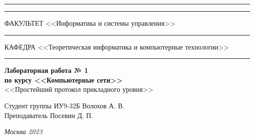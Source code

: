 \documentclass[a4paper, 14pt]{extarticle}
\begin{document}
\begin{titlepage}
\vspace{-25pt}
\hspace{-35pt}\rule{\textwidth}{2.3pt}

\vspace*{-20.3pt}
\hspace{-35pt}\rule{\textwidth}{0.4pt}

\vspace{1.5ex}
\hspace{-35pt} \noindent \small ФАКУЛЬТЕТ\hspace{80pt} <<Информатика и системы управления>>

\vspace*{-16pt}
\hspace{47pt}\rule{0.83\textwidth}{0.4pt}

\vspace{0.5ex}
\hspace{-35pt} \noindent \small КАФЕДРА\hspace{50pt} <<Теоретическая информатика и компьютерные технологии>>

\vspace*{-16pt}
\hspace{30pt}\rule{0.866\textwidth}{0.4pt}
  
\vspace{11em}

\begin{center}
\Large {\bf Лабораторная работа № 1} \\ 
\large {\bf по курсу <<Компьютерные сети>>} \\
\large <<Простейший протокол прикладного уровня>> 
\end{center}\normalsize

\vspace{8em}


\begin{flushright}
  {Студент группы ИУ9-32Б Волохов А. В. \hspace*{15pt}\\ 
  \vspace{2ex}
  Преподаватель Посевин Д. П.\hspace*{15pt}}
\end{flushright}

\bigskip

\vfill
 

\begin{center}
\textsl{Москва 2023}
\end{center}
\end{titlepage}
\end{document}
